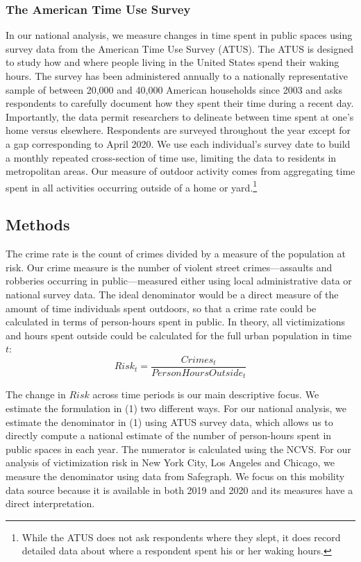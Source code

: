 \documentclass[12pt]{article}
\begin{document}
\subsubsection{The American Time Use Survey}
In our national analysis, we measure changes in time spent in public spaces using survey data from the American Time Use Survey (ATUS). The ATUS is designed to study how and where people living in the United States spend their waking hours. The survey has been administered annually to a nationally representative sample of between 20,000 and 40,000 American households since 2003 and asks respondents to carefully document how they spent their time during a recent day. Importantly, the data permit researchers to delineate between time spent at one's home versus elsewhere. Respondents are surveyed throughout the year except for a gap corresponding to April 2020. We use each individual's survey date to build a monthly repeated cross-section of time use, limiting the data to residents in metropolitan areas. Our measure of outdoor activity comes from aggregating time spent in all activities occurring outside of a home or yard.\footnote{While the ATUS does not ask respondents where they slept, it does record detailed data about where a respondent spent his or her waking hours.} 

\subsection{Methods}
The crime rate is the count of crimes divided by a measure of the population at risk. Our crime measure is the number of violent street crimes---assaults and robberies occurring in public---measured either using local administrative data or national survey data. The ideal denominator would be a direct measure of the amount of time individuals spent outdoors, so that a crime rate could be calculated in terms of person-hours spent in public. In theory, all victimizations and hours spent outside could be calculated for the full urban population in time $t$:
\begin{equation}
Risk_t = \frac{Crimes_t}{PersonHoursOutside_t}
\end{equation}

The change in $Risk$ across time periods is our main descriptive focus. We estimate the formulation in (1) two different ways. For our national analysis, we estimate the denominator in (1) using ATUS survey data, which allows us to directly compute a national estimate of the number of person-hours spent in public spaces in each year. The numerator is calculated using the NCVS. For our analysis of victimization risk in New York City, Los Angeles and Chicago, we measure the denominator using data from Safegraph. We focus on this mobility data source because it is available in both 2019 and 2020 and its measures have a direct interpretation.
\end{document}
